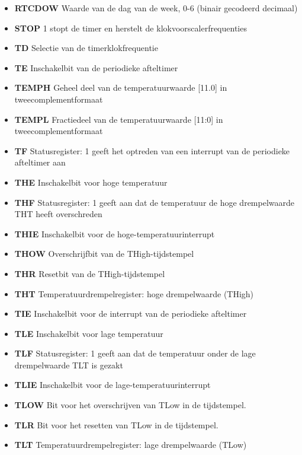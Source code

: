 \begin{itemize}
\item{\bf{RTCDOW}} Waarde van de dag van de week, 0-6 (binair gecodeerd decimaal)
\item{\bf{STOP}} 1 stopt de timer en herstelt de klokvoorscalerfrequenties
\item{\bf{TD}} Selectie van de timerklokfrequentie
\item{\bf{TE}} Inschakelbit van de periodieke afteltimer
\item{\bf{TEMPH}} Geheel deel van de temperatuurwaarde [11.0] in tweecomplementformaat
\item{\bf{TEMPL}} Fractiedeel van de temperatuurwaarde [11:0] in tweecomplementformaat
\item{\bf{TF}} Statusregister: 1 geeft het optreden van een interrupt van de periodieke afteltimer aan
\item{\bf{THE}} Inschakelbit voor hoge temperatuur
\item{\bf{THF}} Statusregister: 1 geeft aan dat de temperatuur de hoge drempelwaarde THT heeft overschreden
\item{\bf{THIE}} Inschakelbit voor de hoge-temperatuurinterrupt
\item{\bf{THOW}} Overschrijfbit van de THigh-tijdstempel
\item{\bf{THR}} Resetbit van de THigh-tijdstempel
\item{\bf{THT}} Temperatuurdrempelregister: hoge drempelwaarde (THigh)
\item{\bf{TIE}} Inschakelbit voor de interrupt van de periodieke afteltimer
\item{\bf{TLE}} Inschakelbit voor lage temperatuur
\item{\bf{TLF}} Statusregister: 1 geeft aan dat de temperatuur onder de lage drempelwaarde TLT is gezakt
\item{\bf{TLIE}} Inschakelbit voor de lage-temperatuurinterrupt
\item{\bf{TLOW}} Bit voor het overschrijven van TLow in de tijdstempel.
\item{\bf{TLR}} Bit voor het resetten van TLow in de tijdstempel.
\item{\bf{TLT}} Temperatuurdrempelregister: lage drempelwaarde (TLow)

\end{itemize}
